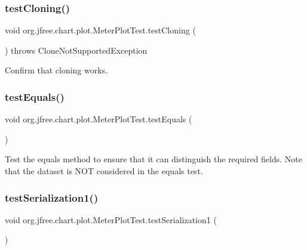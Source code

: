 \subsubsection{\texorpdfstring{test\+Cloning()}{testCloning()}}
{\footnotesize\ttfamily void org.\+jfree.\+chart.\+plot.\+Meter\+Plot\+Test.\+test\+Cloning (\begin{DoxyParamCaption}{ }\end{DoxyParamCaption}) throws Clone\+Not\+Supported\+Exception}

Confirm that cloning works. \mbox{\label{classorg_1_1jfree_1_1chart_1_1plot_1_1_meter_plot_test_af44f9bf5b2a64dc5a055ce70f8160e80}} 
\subsubsection{\texorpdfstring{test\+Equals()}{testEquals()}}
{\footnotesize\ttfamily void org.\+jfree.\+chart.\+plot.\+Meter\+Plot\+Test.\+test\+Equals (\begin{DoxyParamCaption}{ }\end{DoxyParamCaption})}

Test the equals method to ensure that it can distinguish the required fields. Note that the dataset is N\+OT considered in the equals test. \mbox{\label{classorg_1_1jfree_1_1chart_1_1plot_1_1_meter_plot_test_a18623226324da174160406f876256bf3}} 
\subsubsection{\texorpdfstring{test\+Serialization1()}{testSerialization1()}}
{\footnotesize\ttfamily void org.\+jfree.\+chart.\+plot.\+Meter\+Plot\+Test.\+test\+Serialization1 (\begin{DoxyParamCaption}{ }\end{DoxyParamCaption})}

